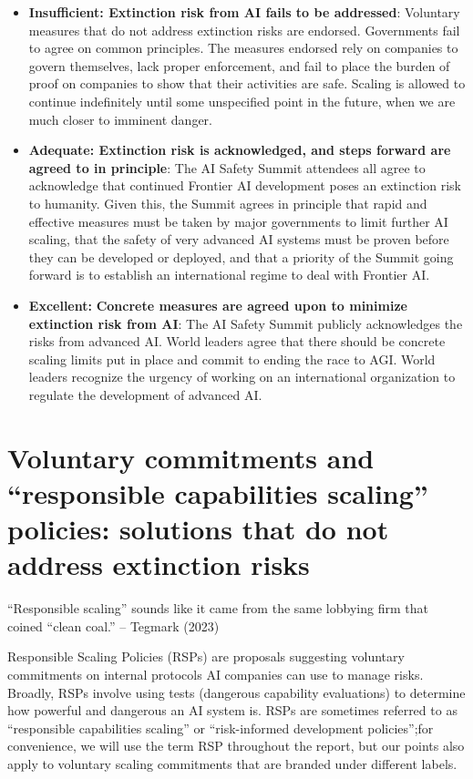 \documentclass[12pt,a4paper]{article}
\begin{document}
\begin{itemize}
    \item \textbf{Insufficient: Extinction risk from AI fails to be addressed}: Voluntary measures that do not address extinction risks are endorsed. Governments fail to agree on common principles. The measures endorsed rely on companies to govern themselves, lack proper enforcement, and fail to place the burden of proof on companies to show that their activities are safe. Scaling is allowed to continue indefinitely until some unspecified point in the future, when we are much closer to imminent danger. 
    \item \textbf{\textbf{Adequate:} Extinction risk is acknowledged, and steps forward are agreed to in principle}: The AI Safety Summit attendees all agree to acknowledge that continued Frontier AI development poses an extinction risk to humanity. Given this, the Summit agrees in principle that rapid and effective measures must be taken by major governments to limit further AI scaling, that the safety of very advanced AI systems must be proven before they can be developed or deployed, and that a priority of the Summit going forward is to establish an international regime to deal with Frontier AI.  
   \item  \textbf{Excellent:} \textbf{Concrete measures are agreed upon to minimize extinction risk from AI}: The AI Safety Summit publicly acknowledges the risks from advanced AI. World leaders agree that there should be concrete scaling limits put in place and commit to ending the race to AGI. World leaders recognize the urgency of working on an international organization to regulate the development of advanced AI.  
\end{itemize}


\newpage
\section{Voluntary commitments and “responsible capabilities scaling” policies: solutions that do not address extinction risks}
\hfill\begin{minipage}{\dimexpr\textwidth-1cm}
“Responsible scaling” sounds like it came from the same lobbying firm that coined “clean coal.” – Tegmark (2023)
\end{minipage}
\hspace{1cm}


Responsible Scaling Policies (RSPs) are proposals suggesting voluntary commitments on internal protocols AI companies can use to manage risks. Broadly, RSPs involve using tests (dangerous capability evaluations) to determine how powerful and dangerous an AI system is. RSPs are sometimes referred to as “responsible capabilities scaling” or “risk-informed development policies”;for convenience, we will use the term RSP throughout the report, but our points also apply to voluntary scaling commitments that are branded under different labels. 
\end{document}
